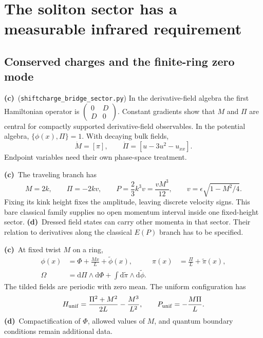\documentclass[11pt,a4paper]{article}
\newcommand{\C}{\textbf{(c)}\ }
\newcommand{\D}{\textbf{(d)}\ }
\newcommand{\dd}{\mathrm d}
\newcommand{\file}[1]{\nolinkurl{#1}}
\newcommand{\scs}{\file{shiftcharge_bridge_sector.py}}
\begin{document}
\section{The soliton sector has a measurable infrared requirement}
\subsection{Conserved charges and the finite-ring zero mode}
\C (\scs) In the derivative-field algebra the first Hamiltonian
operator is $\left(\begin{smallmatrix}0&D\\D&0\end{smallmatrix}\right)$.
Constant gradients show that $M$ and $\Pi$ are central for compactly
supported derivative-field observables. In the potential algebra,
$\{\phi(x),\Pi\}=1$. With decaying bulk fields,
\begin{equation}
 \dot M=[\pi],\qquad
 \dot\Pi=[u-3u^2-u_{xx}].
\end{equation}
Endpoint variables need their own phase-space treatment.

\C The traveling branch has
\begin{equation}
 M=2k,\qquad \Pi=-2kv,\qquad
 P=\frac23k^3v=\frac{vM^3}{12},\qquad
 v=\epsilon\sqrt{1-M^2/4}.
 \label{fixed-sector}
\end{equation}
Fixing its kink height fixes the amplitude, leaving discrete velocity
signs. This bare classical family supplies no open momentum interval
inside one fixed-height sector.
\D Dressed field states can carry other momenta in that sector.
Their relation to derivatives along the classical $E(P)$ branch has to be
specified.

\C At fixed twist $M$ on a ring,
\begin{align}
 \phi(x)&=\Phi+\frac{Mx}{L}+\widetilde\phi(x),&
 \pi(x)&=\frac{\Pi}{L}+\widetilde\pi(x),\nonumber\\
 \Omega&=\dd\Pi\wedge\dd\Phi+
 \int\dd\widetilde\pi\wedge\dd\widetilde\phi .
 \label{ring-sector}
\end{align}
The tilded fields are periodic with zero mean.
The uniform configuration has
\begin{equation}
 H_{\rm unif}=\frac{\Pi^2+M^2}{2L}-\frac{M^3}{L^2},
 \qquad P_{\rm unif}=-\frac{M\Pi}{L}.
\end{equation}
\D Compactification of $\Phi$, allowed values of $M$, and quantum
boundary conditions remain additional data.
\end{document}
